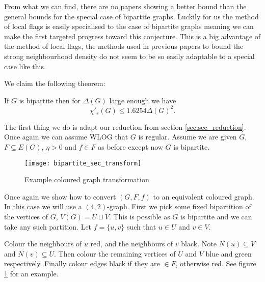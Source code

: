 From what we can find, there are no papers showing a better bound than the general
bounds for the special case of bipartite graphs. Luckily for us the method of local flags
is easily specialised to the case of bipartite graphs meaning we can make the first
targeted progress toward this conjecture. This is a big advantage of the method of local flags,
the methods used in previous papers to bound the strong neighbourhood density do not seem
to be so easily adaptable to a special case like this.

We claim the following theorem:
\begin{theorem}
    \label{thm:sec_bipartite_bound}
    If $G$ is bipartite then for $\Delta(G)$ large enough we have
    \[\chi'_s(G) \leq 1.6254\Delta(G)^2.\]
\end{theorem}

The first thing we do is adapt our reduction from section \ref{sec:sec_reduction}. Once
again we can assume WLOG that $G$ is regular. Assume we are given
$G$, $F \subseteq E(G)$, $\eta > 0$ and $f\in F$ as before except now $G$ is bipartite.

\begin{figure}[ht]
    \centering
    \texttt{[image: bipartite\_sec\_transform]}
    \caption{Example coloured graph transformation}
    \label{fig:bipartite_sec_transform}
\end{figure}

Once again we show how to convert $(G,F,f)$ to an equivalent coloured graph. In this case
we will use a $(4, 2)$-graph. First we pick some fixed bipartition of the vertices
of $G$, $V(G) = U \sqcup V$. This is possible as $G$ is bipartite and we can take any
such partition. Let $f=\{u,v\}$ such that $u\in U$ and $v\in V$.

Colour the neighbours of $u$ red, and the neighbours of $v$ black. Note
$N(u) \subseteq V$ and $N(v)\subseteq U$. Then colour the remaining vertices of
$U$ and $V$ blue and green respectively. Finally colour edges black if they are
$\in F$, otherwise red. See figure \ref{fig:bipartite_sec_transform} for an example.

